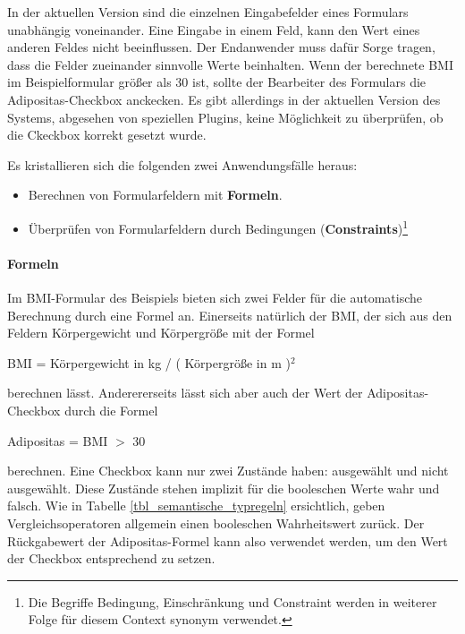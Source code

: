 In der aktuellen Version sind die einzelnen Eingabefelder eines Formulars unabhängig voneinander. Eine Eingabe in einem Feld, kann den Wert eines anderen Feldes nicht beeinflussen. Der Endanwender muss dafür Sorge tragen, dass die Felder zueinander sinnvolle Werte beinhalten. Wenn der berechnete BMI im Beispielformular größer als 30 ist, sollte der Bearbeiter des Formulars die Adipositas-Checkbox anckecken. Es gibt allerdings in der aktuellen Version des Systems, abgesehen von speziellen Plugins, keine Möglichkeit zu überprüfen, ob die Ckeckbox korrekt gesetzt wurde.

Es kristallieren sich die folgenden zwei Anwendungsfälle heraus:

\begin{itemize}
  \item Berechnen von Formularfeldern mit \textbf{Formeln}.
  \item Überprüfen von Formularfeldern durch Bedingungen (\textbf{Constraints})\footnote{Die Begriffe Bedingung, Einschränkung und Constraint werden in weiterer Folge für diesem Context synonym verwendet.}
\end{itemize}

\paragraph{Formeln} 

Im BMI-Formular des Beispiels bieten sich zwei Felder für die automatische Berechnung durch eine Formel an. Einerseits natürlich der BMI, der sich aus den Feldern Körpergewicht und Körpergröße mit der Formel

\begin{center}
 BMI = Körpergewicht in kg / ( Körpergröße in m )$ ^2 $
\end{center}

berechnen lässt. Anderererseits lässt sich aber auch der Wert der Adipositas-Checkbox durch die Formel

\begin{center}
 Adipositas = BMI $ > $ 30
\end{center}

berechnen. Eine Checkbox kann nur zwei Zustände haben: ausgewählt und nicht ausgewählt. Diese Zustände stehen implizit für die booleschen Werte wahr und falsch. Wie in Tabelle \ref{tbl_semantische_typregeln} ersichtlich, geben Vergleichsoperatoren allgemein einen booleschen Wahrheitswert zurück. Der Rückgabewert der Adipositas-Formel kann also verwendet werden, um den Wert der Checkbox entsprechend zu setzen.

